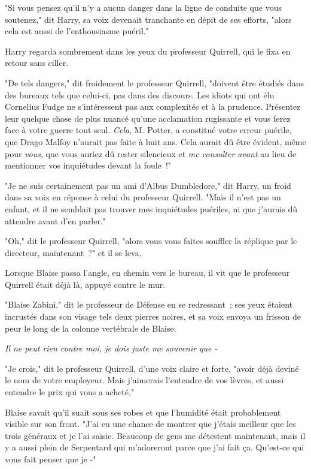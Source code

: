 "Si vous pensez qu'il n'y a aucun danger dans la ligne de conduite que vous soutenez," dit Harry, sa voix devenait tranchante en dépit de ses efforts, "alors cela est aussi de l'enthousiasme puéril."

Harry regarda sombrement dans les yeux du professeur Quirrell, qui le fixa en retour sans ciller.

"De tels dangers," dit froidement le professeur Quirrell, "doivent être étudiés dans des bureaux tels que celui-ci, pas dans des discours. Les idiots qui ont élu Cornelius Fudge ne s'intéressent pas aux complexités et à la prudence. Présentez leur quelque chose de plus nuancé qu'une acclamation rugissante et vous ferez face à votre guerre tout seul. \emph{Cela}, M. Potter, a constitué votre erreur puérile, que Drago Malfoy n'aurait pas faite à huit ans. Cela aurait dû être évident, même pour \emph{vous}, que vous auriez dû rester silencieux et \emph{me consulter avant} au lieu de mentionner vos inquiétudes devant la foule~!"

"Je ne suis certainement pas un ami d'Albus Dumbledore," dit Harry, un froid dans sa voix en réponse à celui du professeur Quirrell. "Mais il n'est pas un enfant, et il ne semblait pas trouver mes inquiétudes puériles, ni que j'aurais dû attendre avant d'en parler."

"Oh," dit le professeur Quirrell, "alors vous vous faites souffler la réplique par le directeur, maintenant~?" et il se leva.

\later

Lorsque Blaise passa l'angle, en chemin vers le bureau, il vit que le professeur Quirrell était déjà là, appuyé contre le mur.

"Blaise Zabini," dit le professeur de Défense en se redressant~; ses yeux étaient incrustés dans son visage tels deux pierres noires, et sa voix envoya un frisson de peur le long de la colonne vertébrale de Blaise.

\emph{Il ne peut rien contre moi, je dois juste me souvenir que -}

"Je crois," dit le professeur Quirrell, d'une voix claire et forte, "avoir déjà deviné le nom de votre employeur. Mais j'aimerais l'entendre de vos lèvres, et aussi entendre le prix qui vous a acheté."

Blaise savait qu'il suait sous ses robes et que l'humidité était probablement visible sur son front. "J'ai eu une chance de montrer que j'étais meilleur que les trois généraux et je l'ai saisie. Beaucoup de gens me détestent maintenant, mais il y a aussi plein de Serpentard qui m'adoreront parce que j'ai fait ça. Qu'est-ce qui vous fait penser que je -"

